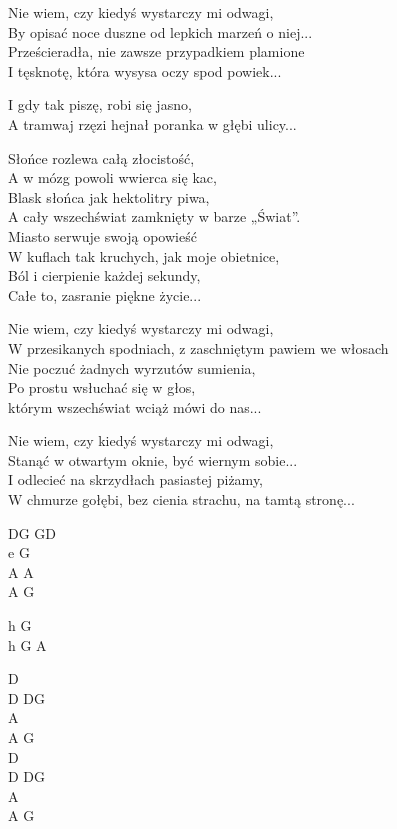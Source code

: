 \begin{text}
    \footnotesize{
Nie wiem, czy kiedyś wystarczy mi odwagi,\\
By opisać noce duszne od lepkich marzeń o niej...\\
Prześcieradła, nie zawsze przypadkiem plamione\\
I tęsknotę, która wysysa oczy spod powiek...

\vin I gdy tak piszę, robi się jasno,\\
\vin A tramwaj rzęzi hejnał poranka w głębi ulicy...

\vin Słońce rozlewa całą złocistość,\\
\vin A w mózg powoli wwierca się kac,\\
\vin Blask słońca jak hektolitry piwa,\\
\vin A cały wszechświat zamknięty w barze „Świat”.\\
\vin Miasto serwuje swoją opowieść\\
\vin W kuflach tak kruchych, jak moje obietnice,\\
\vin Ból i cierpienie każdej sekundy,\\
\vin Całe to, zasranie piękne życie...

Nie wiem, czy kiedyś wystarczy mi odwagi,\\
W przesikanych spodniach, z zaschniętym pawiem we włosach\\
Nie poczuć żadnych wyrzutów sumienia,\\
Po prostu wsłuchać się w głos,\\
którym wszechświat wciąż mówi do nas...

Nie wiem, czy kiedyś wystarczy mi odwagi,\\
Stanąć w otwartym oknie, być wiernym sobie...\\
I odlecieć na skrzydłach pasiastej piżamy,\\
W chmurze gołębi, bez cienia strachu, na tamtą stronę...
    }
\end{text}
\begin{chord}
    \footnotesize{
    DG GD\\
    e G\\
    A A\\
    A G

    h G\\
    h G A

    D\\
    D DG\\
    A\\
    A G\\
    D\\
    D DG\\
    A\\
    A G
    }
\end{chord}